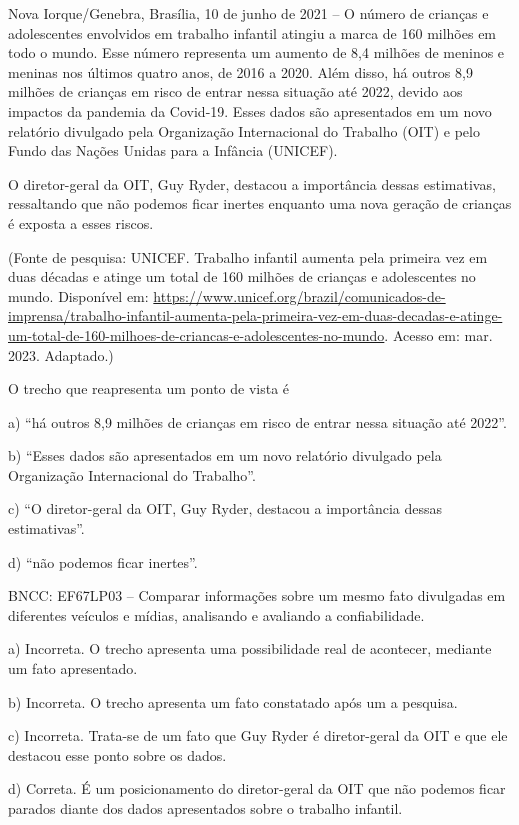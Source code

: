 Nova Iorque/Genebra, Brasília, 10 de junho de 2021 -- O número de
crianças e adolescentes envolvidos em trabalho infantil atingiu a marca
de 160 milhões em todo o mundo. Esse número representa um aumento de 8,4
milhões de meninos e meninas nos últimos quatro anos, de 2016 a 2020.
Além disso, há outros 8,9 milhões de crianças em risco de entrar nessa
situação até 2022, devido aos impactos da pandemia da Covid-19. Esses
dados são apresentados em um novo relatório divulgado pela Organização
Internacional do Trabalho (OIT) e pelo Fundo das Nações Unidas para a
Infância (UNICEF).

O diretor-geral da OIT, Guy Ryder, destacou a importância dessas
estimativas, ressaltando que não podemos ficar inertes enquanto uma nova
geração de crianças é exposta a esses riscos.

(Fonte de pesquisa: UNICEF. Trabalho infantil aumenta pela primeira vez
em duas décadas e atinge um total de 160 milhões de crianças e
adolescentes no mundo. Disponível em: 
\url{https://www.unicef.org/brazil/comunicados-de-imprensa/trabalho-infantil-aumenta-pela-primeira-vez-em-duas-decadas-e-atinge-um-total-de-160-milhoes-de-criancas-e-adolescentes-no-mundo}.
Acesso em: mar. 2023. Adaptado.)

O trecho que reapresenta um ponto de vista é

a) ``há outros 8,9 milhões de crianças em risco de entrar nessa situação
até 2022''.

b) ``Esses dados são apresentados em um novo relatório divulgado pela
Organização Internacional do Trabalho''.

c) ``O diretor-geral da OIT, Guy Ryder, destacou a importância dessas
estimativas''.

d) ``não podemos ficar inertes''.

BNCC: EF67LP03 -- Comparar informações sobre um mesmo fato divulgadas em
diferentes veículos e mídias, analisando e avaliando a confiabilidade.

a) Incorreta. O trecho apresenta uma possibilidade real de acontecer,
mediante um fato apresentado.

b) Incorreta. O trecho apresenta um fato constatado após um a pesquisa.

c) Incorreta. Trata-se de um fato que Guy Ryder é diretor-geral da OIT e
que ele destacou esse ponto sobre os dados.

d) Correta. É um posicionamento do diretor-geral da OIT que não podemos
ficar parados diante dos dados apresentados sobre o trabalho infantil.


